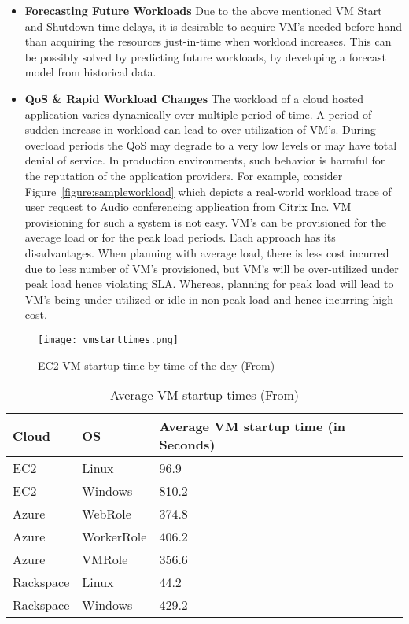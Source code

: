 \begin{itemize}
  \item \textbf{Forecasting Future Workloads} Due to the above mentioned VM Start and Shutdown time delays, it is desirable to acquire VM's needed before hand than acquiring the resources just-in-time when workload increases\cite{roy2011efficient}. This can be possibly solved by predicting future workloads, by developing a forecast model from historical data\cite{roy2011efficient}.
  \item \textbf{QoS \& Rapid Workload Changes} The workload of a cloud hosted application varies dynamically over multiple period of time. A period of sudden increase in workload can lead to over-utilization of VM's. During overload periods the QoS may degrade to a very low levels or may have total denial of service. In production environments, such behavior is harmful for the reputation of the application providers. For example, consider Figure~\ref{figure:sampleworkload} which depicts a real-world workload trace of user request to Audio conferencing application from Citrix Inc. VM provisioning for such a system is not easy. VM's can be provisioned for the average load or for the peak load periods. Each approach has its disadvantages. When planning with average load, there is less cost incurred due to less number of VM's provisioned, but VM's will be over-utilized under peak load hence violating SLA. Whereas, planning for peak load will lead to VM's being under utilized or idle in non peak load and hence incurring high cost.
\end{itemize}

\begin{figure}[h]
  \begin{center}
    \texttt{[image: vmstarttimes.png]}
    \caption{EC2 VM startup time by time of the day (From\cite{mao2012performance})}
    \label{figure:vmstartuptimes}
  \end{center}
\end{figure}

\begin{flushleft}
  \begin{table}
    \begin{tabular}{ | l | l | l |}
      \hline
      Cloud & OS & Average VM startup time (in Seconds) \\ \hline
      EC2 & Linux & 96.9 \\ \hline
      EC2 & Windows & 810.2 \\ \hline
      Azure & WebRole & 374.8 \\ \hline
      Azure & WorkerRole & 406.2 \\ \hline
      Azure & VMRole & 356.6 \\ \hline
      Rackspace & Linux & 44.2 \\ \hline
      Rackspace & Windows & 429.2 \\ \hline
    \end{tabular}
    \caption{Average VM startup times (From\cite{mao2012performance})}
     \label{table:avgvmtime}
\end{table}
\end{flushleft}

